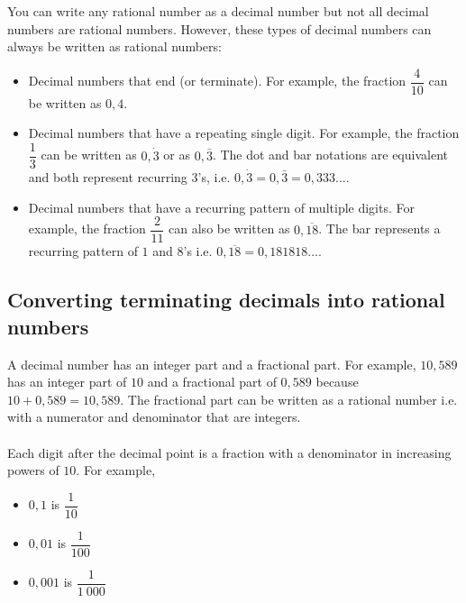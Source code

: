 You can write any rational number as a decimal number but not all
decimal numbers are rational numbers. However, these types of decimal
numbers can always be written as rational numbers:\par 
\begin{itemize}
\item Decimal numbers that end (or terminate). For example, the fraction $\dfrac{4}{10}$ can be written as $0,4$.
\item Decimal numbers that have a repeating single digit. For example, the fraction $\dfrac{1}{3}$ can be written as 
$0,\dot{3}$ or as $0,\bar{3}$. 
The dot and bar notations are equivalent and both represent recurring $3$'s, i.e.
$0,\dot{3} = 0,\bar{3} = 0,333\ldots$.
\item Decimal numbers that have a recurring pattern of multiple digits. For example, the fraction $\dfrac{2}{11}$ can also be written as 
$0,\overline{18}$. 
The bar represents a recurring pattern of $1$ and $8$'s i.e.
$0,\overline{18} = 0,181818\ldots$.
\end{itemize}





\subsection{Converting terminating decimals into rational numbers}

A decimal number has an integer part and a fractional part. For example, $10,589$ has an integer part of $10$ and a fractional part of $0,589$ because $10+0,589=10,589$. The fractional part can be written as a rational number i.e. with a numerator and denominator that are integers. \\
\\
Each digit after the decimal point is a fraction with a denominator in increasing powers of $10$. For example,
\begin{itemize}
\item $0,1$ is $\dfrac{1}{10}$
\item $0,01$ is $\dfrac{1}{100}$
\item $0,001$ is $\dfrac{1}{1~000}$
\end{itemize}

